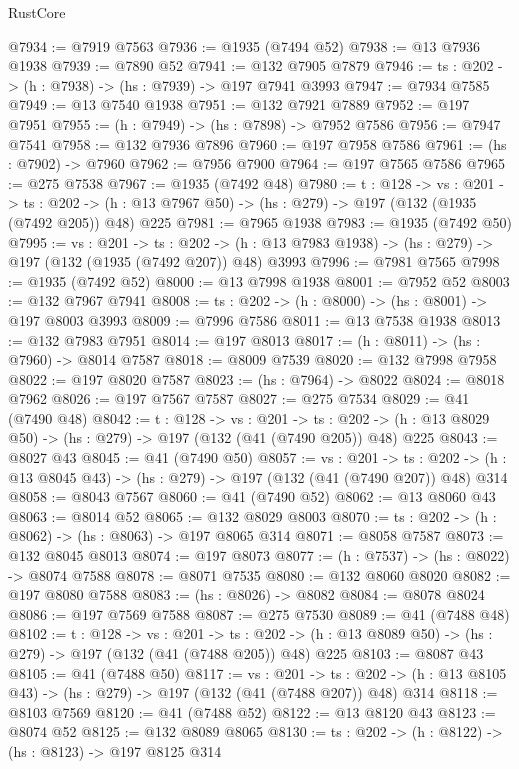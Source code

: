 \begin{lexlean}{RustCore}
\begin{coremodule}
@7934 := @7919 @7563
@7936 := @1935 (@7494 @52)
@7938 := @13 @7936 @1938
@7939 := @7890 @52
@7941 := @132 @7905 @7879
@7946 := {ts : @202} -> (h : @7938) -> (hs : @7939) -> @197 @7941 @3993
@7947 := @7934 @7585
@7949 := @13 @7540 @1938
@7951 := @132 @7921 @7889
@7952 := @197 @7951
@7955 := (h : @7949) -> (hs : @7898) -> @7952 @7586
@7956 := @7947 @7541
@7958 := @132 @7936 @7896
@7960 := @197 @7958 @7586
@7961 := (hs : @7902) -> @7960
@7962 := @7956 @7900
@7964 := @197 @7565 @7586
@7965 := @275 @7538
@7967 := @1935 (@7492 @48)
@7980 := {t : @128} ->
  {vs : @201} ->
  {ts : @202} -> (h : @13 @7967 @50) -> (hs : @279) -> @197 (@132 (@1935 (@7492 @205)) @48) @225
@7981 := @7965 @1938
@7983 := @1935 (@7492 @50)
@7995 := {vs : @201} ->
  {ts : @202} -> (h : @13 @7983 @1938) -> (hs : @279) -> @197 (@132 (@1935 (@7492 @207)) @48) @3993
@7996 := @7981 @7565
@7998 := @1935 (@7492 @52)
@8000 := @13 @7998 @1938
@8001 := @7952 @52
@8003 := @132 @7967 @7941
@8008 := {ts : @202} -> (h : @8000) -> (hs : @8001) -> @197 @8003 @3993
@8009 := @7996 @7586
@8011 := @13 @7538 @1938
@8013 := @132 @7983 @7951
@8014 := @197 @8013
@8017 := (h : @8011) -> (hs : @7960) -> @8014 @7587
@8018 := @8009 @7539
@8020 := @132 @7998 @7958
@8022 := @197 @8020 @7587
@8023 := (hs : @7964) -> @8022
@8024 := @8018 @7962
@8026 := @197 @7567 @7587
@8027 := @275 @7534
@8029 := @41 (@7490 @48)
@8042 := {t : @128} ->
  {vs : @201} ->
  {ts : @202} -> (h : @13 @8029 @50) -> (hs : @279) -> @197 (@132 (@41 (@7490 @205)) @48) @225
@8043 := @8027 @43
@8045 := @41 (@7490 @50)
@8057 := {vs : @201} ->
  {ts : @202} -> (h : @13 @8045 @43) -> (hs : @279) -> @197 (@132 (@41 (@7490 @207)) @48) @314
@8058 := @8043 @7567
@8060 := @41 (@7490 @52)
@8062 := @13 @8060 @43
@8063 := @8014 @52
@8065 := @132 @8029 @8003
@8070 := {ts : @202} -> (h : @8062) -> (hs : @8063) -> @197 @8065 @314
@8071 := @8058 @7587
@8073 := @132 @8045 @8013
@8074 := @197 @8073
@8077 := (h : @7537) -> (hs : @8022) -> @8074 @7588
@8078 := @8071 @7535
@8080 := @132 @8060 @8020
@8082 := @197 @8080 @7588
@8083 := (hs : @8026) -> @8082
@8084 := @8078 @8024
@8086 := @197 @7569 @7588
@8087 := @275 @7530
@8089 := @41 (@7488 @48)
@8102 := {t : @128} ->
  {vs : @201} ->
  {ts : @202} -> (h : @13 @8089 @50) -> (hs : @279) -> @197 (@132 (@41 (@7488 @205)) @48) @225
@8103 := @8087 @43
@8105 := @41 (@7488 @50)
@8117 := {vs : @201} ->
  {ts : @202} -> (h : @13 @8105 @43) -> (hs : @279) -> @197 (@132 (@41 (@7488 @207)) @48) @314
@8118 := @8103 @7569
@8120 := @41 (@7488 @52)
@8122 := @13 @8120 @43
@8123 := @8074 @52
@8125 := @132 @8089 @8065
@8130 := {ts : @202} -> (h : @8122) -> (hs : @8123) -> @197 @8125 @314

\end{coremodule}
\end{lexlean}
